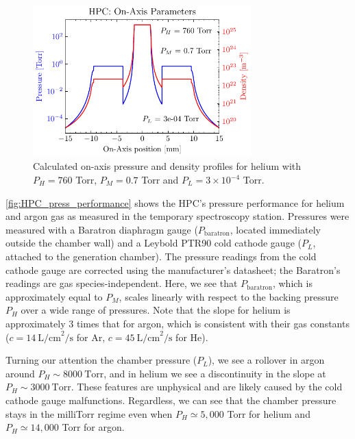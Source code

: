 \begin{figure}
	\centering
	\includegraphics[width=0.75\textwidth]{figures/chap3/HPC_on-axis-pressure.pdf}
	\caption{Calculated on-axis pressure and density profiles for helium with $P_H = 760$ Torr, $P_M = 0.7$ Torr and $P_L = 3 \times 10^{-4}$ Torr.}
	\label{fig:HPC_on-axis-pressure}
\end{figure}

\cref{fig:HPC_press_performance} shows the HPC's pressure performance for helium and argon gas as measured in the temporary spectroscopy station. Pressures were measured with a Baratron diaphragm gauge ($P_{\textrm{baratron}}$, located immediately outside the chamber wall) and a Leybold PTR90 cold cathode gauge ($P_L$, attached to the generation chamber). The pressure readings from the cold cathode gauge are corrected using the manufacturer's datasheet; the Baratron's readings are gas species-independent. Here, we see that $P_{\textrm{baratron}}$, which is approximately equal to $P_M$, scales linearly with respect to the backing pressure $P_H$ over a wide range of pressures. Note that the slope for helium is approximately 3 times that for argon, which is consistent with their gas constants ($c=14 \ \textrm{L/cm}^2\textrm{/s}$ for Ar, $c=45 \ \textrm{L/cm}^2\textrm{/s}$ for He).

Turning our attention the chamber pressure ($P_L$), we see a rollover in argon around $P_H \sim 8000 \ \textrm{Torr}$, and in helium we see a discontinuity in the slope at $P_H \sim 3000 \ \textrm{Torr}$. These features are unphysical and are likely caused by the cold cathode gauge malfunctions. Regardless, we can see that the chamber pressure stays in the milliTorr regime even when $P_H \simeq 5,000$ Torr for helium and $P_H \simeq 14,000$ Torr for argon.

